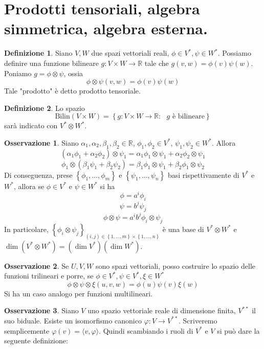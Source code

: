 \documentclass[a4paper,11pt]{article}
\theoremstyle{definition}
\newtheorem{osservazione}{Osservazione}[section]
\newtheorem{definizione}{Definizione}[section]
\theoremstyle{theorem}
\newcommand{\bil}[2]{\textrm{Bilin}\left(#1\times#2\right)}
\begin{document}
\section{Prodotti tensoriali, algebra simmetrica, algebra esterna.}
\begin{definizione}
	Siano $V,W$ due spazi vettoriali reali, $\phi\in V^*,\psi\in W^*$. Possiamo definire una funzione bilineare $g\colon V\times W\to\mathbb{R}$ tale che $g(v,w)=\phi(v)\psi(w)$. Poniamo $g=\phi\otimes\psi$, ossia
	\[\phi\otimes\psi(v,w)=\phi(v)\psi(w)\]
	Tale "prodotto" è detto prodotto tensoriale.
\end{definizione}
\begin{definizione}
	Lo spazio \[\bil{V}{W}=\left\{g\colon V\times W\to\mathbb{R}:\textrm{ $g$ è bilineare}\right\}\] sarà indicato con $V^*\otimes W^*$.
\end{definizione}
\begin{osservazione}
	Siano $\alpha_1,\alpha_2,\beta_1,\beta_2\in\mathbb{R}$, $\phi_1,\phi_2\in V^*$, $\psi_1,\psi_2\in W^*$. Allora
	\[(\alpha_1\phi_1+\alpha_2\phi_2)\otimes\psi_1=\alpha_1\phi_1\otimes\psi_1+\alpha_2\phi_2\otimes\psi_1\]
	\[\phi_1\otimes(\beta_1\psi_1+\beta_2\psi_2)=\beta_1\phi_1\otimes\psi_1+\beta_2\phi_1\otimes\psi_2\]
	Di conseguenza, prese $\left\{\phi_1,\dots,\phi_m\right\}$ e $\left\{\psi_1,\dots,\psi_n\right\}$ basi rispettivamente di $V^*$ e $W^*$, allora se $\phi\in V^*$ e $\psi\in W^*$ si ha
	\[\phi=a^i\phi_i\]
	\[\psi=b^j\psi_j\]
	\[\phi\otimes\psi=a^ib^j\phi_i\otimes\psi_j\]
	In particolare, $\left\{\phi_i\otimes\psi_j\right\}_{(i,j)\in\left\{1,\dots,m\right\}\times\left\{1,\dots,n\right\}}$ è una base di $V^*\otimes W^*$ e $\dim \left(V^*\otimes W^*\right)=\left(\dim V^*\right)\left(\dim W^*\right)$.
\end{osservazione}
\begin{osservazione}
	Se $U,V,W$ sono spazi vettoriali, posso costruire lo spazio delle funzioni trilineari e porre, se $\phi\in V^*,\psi\in V^*,\xi\in W^*$
	\[\phi\otimes\psi\otimes\xi(u,v,w)=\phi(u)\psi(v)\xi(w)\]
	Si ha un caso analogo per funzioni multilineari.
\end{osservazione}
\begin{osservazione}
	Siano $V$ uno spazio vettoriale reale di dimensione finita, $V^{**}$ il suo biduale. Esiste un isomorfismo canonico $\varphi\colon V\to V^{**}$. Scriveremo semplicemente $\varphi(v)=\langle v,\varphi\rangle$. Quindi scambiando i ruoli di $V^*$ e $V$ si può dare la seguente definizione:
\end{osservazione}
\end{document}
